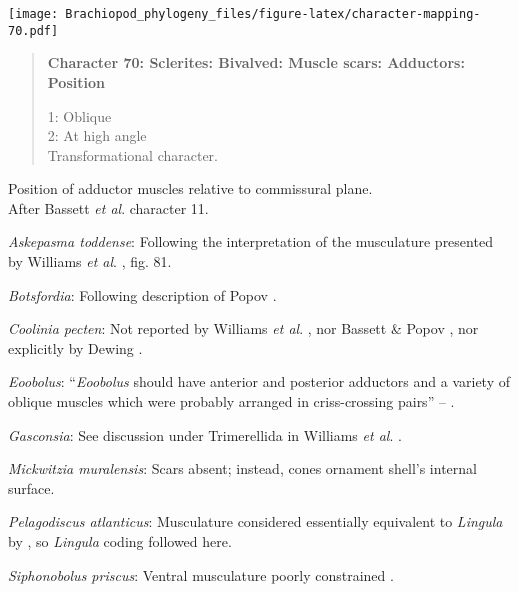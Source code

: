 \documentclass[openany]{book}
\theoremstyle{definition}
\theoremstyle{definition}
\theoremstyle{definition}
\theoremstyle{remark}
\begin{document}
\texttt{[image: Brachiopod\_phylogeny\_files/figure-latex/character-mapping-70.pdf]}

\begin{quote}
\textbf{Character 70: Sclerites: Bivalved: Muscle scars: Adductors:
Position}

1: Oblique\\
2: At high angle\\
Transformational character.
\end{quote}

Position of adductor muscles relative to commissural plane.\\
After Bassett \emph{et al}.
\citeyearpar{Bassett2001Functionalmorphology} character 11.

\hypertarget{Askepasma_toddense-coding-70}{}
\emph{Askepasma toddense}: Following the interpretation of the
musculature presented by Williams \emph{et al}.
\citeyearpar{Williams2000LinguliformeaCraniiformea}, fig. 81.

\hypertarget{Botsfordia-coding-70}{}
\emph{Botsfordia}: Following description of Popov
\citeyearpar{Popov1992TheCambrian}.

\hypertarget{Coolinia_pecten-coding-70}{}
\emph{Coolinia pecten}: Not reported by Williams \emph{et al}.
\citeyearpar{Williams2000LinguliformeaCraniiformea}, nor Bassett \&
Popov \citeyearpar{Bassett2017Earliestontogeny}, nor explicitly by
Dewing \citeyearpar{Dewing2001Hingemodifications}.

\hypertarget{Eoobolus-coding-70}{}
\emph{Eoobolus}: ``\emph{Eoobolus} should have anterior and posterior
adductors and a variety of oblique muscles which were probably arranged
in criss-crossing pairs'' -- \citet{Balthasar2009Thebrachiopod}.

\hypertarget{Gasconsia-coding-70}{}
\emph{Gasconsia}: See discussion under Trimerellida in Williams \emph{et
al}. \citeyearpar{Williams2000LinguliformeaCraniiformea}.

\hypertarget{Mickwitzia_muralensis-coding-70}{}
\emph{Mickwitzia muralensis}: Scars absent; instead, cones ornament
shell's internal surface.

\hypertarget{Pelagodiscus_atlanticus-coding-70}{}
\emph{Pelagodiscus atlanticus}: Musculature considered essentially
equivalent to \emph{Lingula} by
\citet{Williams2000LinguliformeaCraniiformea}, so \emph{Lingula} coding
followed here.

\hypertarget{Siphonobolus_priscus-coding-70}{}
\emph{Siphonobolus priscus}: Ventral musculature poorly constrained
\citep{Williams2000LinguliformeaCraniiformea, Popov2009Earlyontogeny}.
\end{document}
